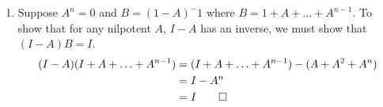 \documentclass[12pt, a4paper]{article}
\begin{document}
\begin{enumerate}[Q\arabic*.]
\begin{enumerate}[(\alph*)]
        \item Suppose $A^n = 0$ and $B = (1-A)^-1$ where $B = 1 + A + \ldots + A^{n-1}$. To show that for any nilpotent $A$, $I - A$ has an inverse, we must show that $(I-A)B  = I$.
          \begin{align*}
            (I-A)(I + A + \ldots + A^{n-1}) &= (I + A + \ldots + A^{n-1}) - (A + A^2 + A^n) \\
                                            &= I - A^n \\
                                            &= I \qed
          \end{align*}
      \end{enumerate}
\end{enumerate}
\end{document}
